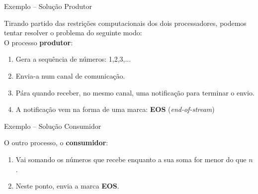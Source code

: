 \begin{frame}{Exemplo -- Solução \hfill \color{mLightBrown}Produtor}

  Tirando partido das restrições computacionais dos dois processadores, podemos tentar resolver o problema do seguinte modo:\\
  \pause
  \vspace*{3mm}
 O processo \textbf{produtor}:
  \begin{enumerate}
  \item Gera a sequência de números: 1,2,3,...
    \pause
  \item Envia-a num canal de comunicação.
    \pause
  \item Pára quando receber, no mesmo canal, uma notificação para terminar o envio.
    \pause
  \item A notificação vem na forma de uma marca: \textbf{EOS} (\textit{end-of-stream})
  \end{enumerate}

\end{frame}


\begin{frame}{Exemplo -- Solução \hfill \color{mLightBrown}Consumidor}

  O outro processo, o \textbf{consumidor}:
  \vspace{2mm}
  \begin{enumerate}
  \item Vai somando os números que recebe enquanto a sua soma for menor do que $n$.
    \pause
    \vspace{5mm}
  \item Neste ponto, envia a marca \textbf{EOS}.
  \end{enumerate}
\end{frame}

